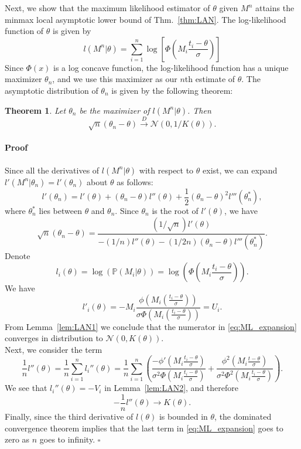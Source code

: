 \documentclass[letterpaper, conference]{IEEEtran}      %
\newtheorem{thm}{\bf{Theorem}}
\newenvironment{proof}{\paragraph*{Proof}}{\hfill$\square$ \newline}
\begin{document}
Next, we show that the maximum likelihood estimator of $\theta$ given $M^n$ attains the minmax local asymptotic lower bound of Thm.~\ref{thm:LAN}. The log-likelihood function of $\theta$ is given by
\[
l(M^n  |\theta ) =  \sum_{i=1}^n \log\left[ \Phi \left( M_i \frac{t_i - \theta}{\sigma} \right) \right]
\]
Since $\Phi(x)$ is a log concave function, the log-likelihood function has a unique maximizer $\theta_n$, and we use this maximizer as our $n$th estimate of $\theta$. The asymptotic distribution of $\theta_n$ is given by the following theorem:
\begin{thm} \label{thm:dist_thresholds}
Let $\theta_n$ be the maximizer of $l(M^n|\theta)$. Then 
\[
\sqrt{n}(\theta_n - \theta) \overset{D}{\rightarrow} \mathcal N\left(0,1/K(\theta) \right).
\]
\end{thm}

\begin{proof}
Since all the derivatives of $l(M^n|\theta)$ with respect to $\theta$ exist, we can expand $l'(M^n|\theta_n) = l'(\theta_n)$ about $\theta$ as follows:
\[
l'(\theta_n) = l'(\theta) + \left( \theta_n - \theta \right) l''(\theta) + \frac{1}{2} \left( \theta_n - \theta\right)^2 l'''(\theta_n^*),
\]
where $\theta_n^*$ lies between $\theta$ and $\theta_n$. Since $\theta_n$ is the root of $l'(\theta)$, we have
\begin{equation}
\sqrt{n}(\theta_n - \theta) = \frac{(1/\sqrt{n}) l'(\theta)}{ -(1/n)l''(\theta) - (1/2n)(\theta_n - \theta)l'''(\theta_n^*)}.
\label{eq:ML_expansion}
\end{equation}
Denote
\[
l_i(\theta) = \log( \mathbb P(M_i | \theta) ) = \log\left( \Phi \left(M_i \frac {t_i -  \theta} {\sigma}\right) \right).
\]
We have
\[
l'_i(\theta) = -M_i \frac{\phi \left(M_i\left( \frac{t_i - \theta}{\sigma} \right) \right)}{\sigma \Phi \left(M_i \left( \frac{t_i - \theta}{\sigma} \right) \right)} = U_i. 
\]
From Lemma~\ref{lem:LAN1} we conclude that the numerator in \eqref{eq:ML_expansion} converges in distribution to $\mathcal N\left(0,K(\theta) \right)$. \\

Next, we consider the term
\[
\frac{1}{n} l''(\theta) = \frac{1}{n} \sum_{i=1}^n l_i''(\theta) = \frac{1}{n} \sum_{i=1}^n \left(\frac{ -\phi' \left(M_i \frac{t_i-\theta}{\sigma } \right) }{\sigma^2 \Phi \left( M_i \frac{t_i-\theta}{\sigma } \right)} + \frac{\phi^2\left(M_i \frac{t-\theta}{\sigma } \right)} {\sigma^2 \Phi^2 \left(M_i \frac{t_i-\theta}{\sigma } \right)}  \right).
\]
We see that $l_i''(\theta) = -V_i$ in Lemma~\ref{lem:LAN2}, and therefore
\[
-\frac{1}{n} l''(\theta) \rightarrow K(\theta). 
\]
Finally, since the third derivative of $l(\theta)$ is bounded in $\theta$, the dominated convergence theorem implies that the last term in \eqref{eq:ML_expansion} goes to zero as $n$ goes to infinity.
\end{proof}
\end{document}
